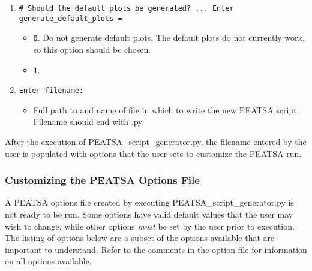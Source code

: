 \begin{enumerate}
	\item \texttt{\# Should the default plots be generated? ... Enter generate\_default\_plots = }
	\begin{itemize}
		\item \texttt{0}. Do not generate default plots. The default plots do not currently work, so this option should be chosen.
		\item \texttt{1}.
	\end{itemize}
	\item \texttt{Enter filename: }
	\begin{itemize}
		\item Full path to and name of file in which to write the new \ac{PEATSA} script. Filename should end with .py.
	\end{itemize}
\end{enumerate}

\noindent After the execution of PEATSA\_script\_generator.py, the filename entered by the user is populated with options that the user sets to customize the \ac{PEATSA} run. 

\subsubsection{Customizing the PEATSA Options File}
\label{sec:customizing_the_peatsa_options_file}

A \ac{PEATSA} options file created by executing PEATSA\_script\_generator.py is not ready to be run. Some options have valid default values that the user may wish to change, while other options \emph{must} be set by the user prior to execution.  The listing of options below are a subset of the options available that are important to understand. Refer to the comments in the option file for information on all options available.

